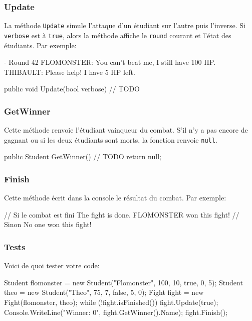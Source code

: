 \subsubsection{Update}

La méthode \texttt{Update} simule l'attaque d'un étudiant sur l'autre puis l'inverse.
Si \texttt{verbose} est à \texttt{true}, alors la méthode affiche le \texttt{round} courant et l'état des étudiants. Par exemple:\\

\begin{shell}
- Round 42
FLOMONSTER: You can't beat me, I still have 100 HP.
THIBAULT: Please help! I have 5 HP left.
\end{shell}

\begin{code}
public void Update(bool verbose)
{
    // TODO
}
\end{code}

\subsubsection{GetWinner}

Cette méthode renvoie l'étudiant vainqueur du combat. S'il n'y a pas encore de gagnant ou si les deux
étudiants sont morts, la fonction renvoie \texttt{null}.

\begin{code}
public Student GetWinner()
{
	// TODO
    return null;
}
\end{code}

\subsubsection{Finish}

Cette méthode écrit dans la console le résultat du combat. Par exemple:

\begin{shell}
// Si le combat est fini
The fight is done.
FLOMONSTER won this fight!
// Sinon
No one won this fight!
\end{shell}

\subsubsection{Tests}

Voici de quoi tester votre code:\\

\begin{code}
Student flomonster = new Student("Flomonster", 100, 10, true, 0, 5);
Student theo = new Student("Theo", 75, 7, false, 5, 0);
Fight fight = new Fight(flomonster, theo);
while (!fight.isFinished())
	fight.Update(true);
Console.WriteLine("Winner: {0}", fight.GetWinner().Name);
fight.Finish();
\end{code}

